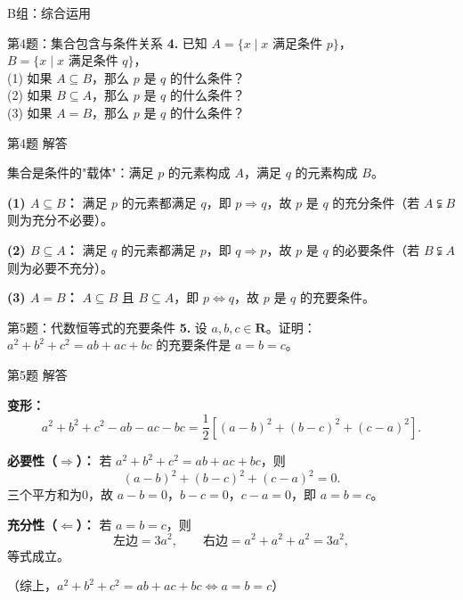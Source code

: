 \documentclass[10pt,aspectratio=169,serif]{beamer}
\begin{document}
\begin{frame}[t]{B组：综合运用}
\end{frame}

\begin{frame}[t]{第4题：集合包含与条件关系}
\textbf{4.} 已知 $A = \{x \mid x \text{ 满足条件 } p\}$，$B = \{x \mid x \text{ 满足条件 } q\}$，\\
(1) 如果 $A \subseteq B$，那么 $p$ 是 $q$ 的什么条件？\\
(2) 如果 $B \subseteq A$，那么 $p$ 是 $q$ 的什么条件？\\
(3) 如果 $A = B$，那么 $p$ 是 $q$ 的什么条件？
\end{frame}

\begin{frame}[t]{第4题 解答}
\begin{tcolorbox}[colback=orange!10,colframe=orange,title=\textbf{解}]
集合是条件的"载体"：满足 $p$ 的元素构成 $A$，满足 $q$ 的元素构成 $B$。

\textbf{(1) $A\subseteq B$：} 满足 $p$ 的元素都满足 $q$，即 $p\Rightarrow q$，故 $p$ 是 $q$ 的\alert{充分条件}（若 $A\subsetneqq B$ 则为充分不必要）。

\textbf{(2) $B\subseteq A$：} 满足 $q$ 的元素都满足 $p$，即 $q\Rightarrow p$，故 $p$ 是 $q$ 的\alert{必要条件}（若 $B\subsetneqq A$ 则为必要不充分）。

\textbf{(3) $A=B$：} $A\subseteq B$ 且 $B\subseteq A$，即 $p\Leftrightarrow q$，故 $p$ 是 $q$ 的\alert{充要条件}。
\end{tcolorbox}
\end{frame}

\begin{frame}[t]{第5题：代数恒等式的充要条件}
\textbf{5.} 设 $a,b,c\in\mathbf{R}$。证明：$a^2+b^2+c^2=ab+ac+bc$ 的充要条件是 $a=b=c$。
\end{frame}

\begin{frame}[t]{第5题 解答}
\begin{tcolorbox}[colback=orange!10,colframe=orange,title=\textbf{证明}]
\textbf{变形：}
\[
a^2+b^2+c^2-ab-ac-bc = \frac{1}{2}\left[(a-b)^2+(b-c)^2+(c-a)^2\right].
\]

\textbf{必要性（$\Rightarrow$）：} 若 $a^2+b^2+c^2=ab+ac+bc$，则
\[
(a-b)^2+(b-c)^2+(c-a)^2 = 0.
\]
三个平方和为0，故 $a-b=0$，$b-c=0$，$c-a=0$，即 $a=b=c$。

\textbf{充分性（$\Leftarrow$）：} 若 $a=b=c$，则
\[
\text{左边}=3a^2,\qquad \text{右边}=a^2+a^2+a^2=3a^2,
\]
等式成立。

\vspace{0.3em}
\small（综上，$a^2+b^2+c^2=ab+ac+bc \Longleftrightarrow a=b=c$）
\end{tcolorbox}
\end{frame}
\end{document}
